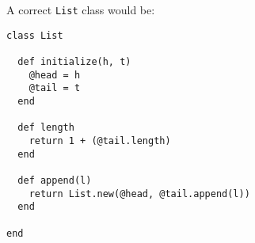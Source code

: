 \documentclass[11pt]{article}
\begin{document}
\begin{enumerate}
          A correct \texttt{List} class would be:

          \begin{verbatim}
class List

  def initialize(h, t)
    @head = h
    @tail = t
  end

  def length
    return 1 + (@tail.length)
  end

  def append(l)
    return List.new(@head, @tail.append(l))
  end

end\end{verbatim}

  \end{enumerate}
\end{document}
